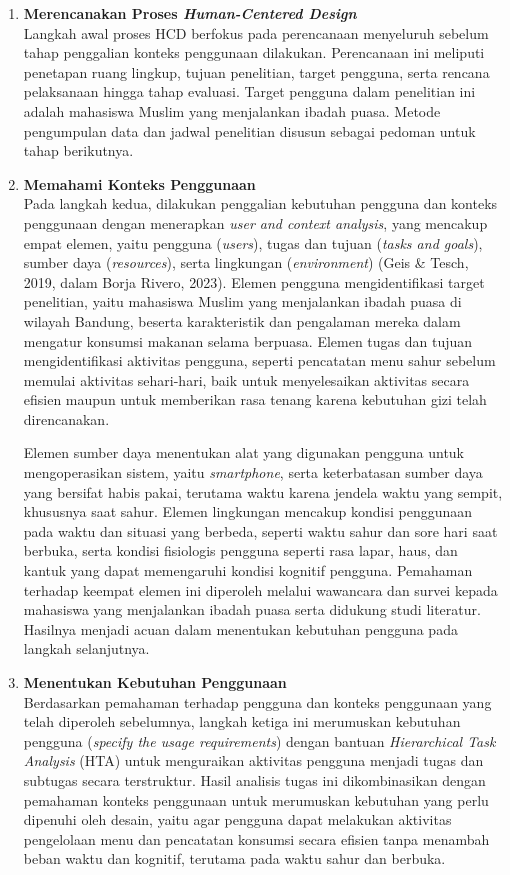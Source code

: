 \begin{enumerate}
    \item \textbf{Merencanakan Proses \textit{Human-Centered Design}} \\
    Langkah awal proses HCD berfokus pada perencanaan menyeluruh sebelum tahap penggalian konteks penggunaan dilakukan. Perencanaan ini meliputi penetapan ruang lingkup, tujuan penelitian, target pengguna, serta rencana pelaksanaan hingga tahap evaluasi. Target pengguna dalam penelitian ini adalah mahasiswa Muslim yang menjalankan ibadah puasa. Metode pengumpulan data dan jadwal penelitian disusun sebagai pedoman untuk tahap berikutnya.

    \item \textbf{Memahami Konteks Penggunaan} \\
    Pada langkah kedua, dilakukan penggalian kebutuhan pengguna dan konteks penggunaan dengan menerapkan \textit{user and context analysis}, yang mencakup empat elemen, yaitu pengguna (\textit{users}), tugas dan tujuan (\textit{tasks and goals}), sumber daya (\textit{resources}), serta lingkungan (\textit{environment}) (Geis \& Tesch, 2019, dalam Borja Rivero, 2023). Elemen pengguna mengidentifikasi target penelitian, yaitu mahasiswa Muslim yang menjalankan ibadah puasa di wilayah Bandung, beserta karakteristik dan pengalaman mereka dalam mengatur konsumsi makanan selama berpuasa. Elemen tugas dan tujuan mengidentifikasi aktivitas pengguna, seperti pencatatan menu sahur sebelum memulai aktivitas sehari-hari, baik untuk menyelesaikan aktivitas secara efisien maupun untuk memberikan rasa tenang karena kebutuhan gizi telah direncanakan.

    Elemen sumber daya menentukan alat yang digunakan pengguna untuk mengoperasikan sistem, yaitu \textit{smartphone}, serta keterbatasan sumber daya yang bersifat habis pakai, terutama waktu karena jendela waktu yang sempit, khususnya saat sahur. Elemen lingkungan mencakup kondisi penggunaan pada waktu dan situasi yang berbeda, seperti waktu sahur dan sore hari saat berbuka, serta kondisi fisiologis pengguna seperti rasa lapar, haus, dan kantuk yang dapat memengaruhi kondisi kognitif pengguna. Pemahaman terhadap keempat elemen ini diperoleh melalui wawancara dan survei kepada mahasiswa yang menjalankan ibadah puasa serta didukung studi literatur. Hasilnya menjadi acuan dalam menentukan kebutuhan pengguna pada langkah selanjutnya.

    \item \textbf{Menentukan Kebutuhan Penggunaan} \\
    Berdasarkan pemahaman terhadap pengguna dan konteks penggunaan yang telah diperoleh sebelumnya, langkah ketiga ini merumuskan kebutuhan pengguna (\textit{specify the usage requirements}) dengan bantuan \textit{Hierarchical Task Analysis} (HTA) untuk menguraikan aktivitas pengguna menjadi tugas dan subtugas secara terstruktur. Hasil analisis tugas ini dikombinasikan dengan pemahaman konteks penggunaan untuk merumuskan kebutuhan yang perlu dipenuhi oleh desain, yaitu agar pengguna dapat melakukan aktivitas pengelolaan menu dan pencatatan konsumsi secara efisien tanpa menambah beban waktu dan kognitif, terutama pada waktu sahur dan berbuka.


\end{enumerate}
